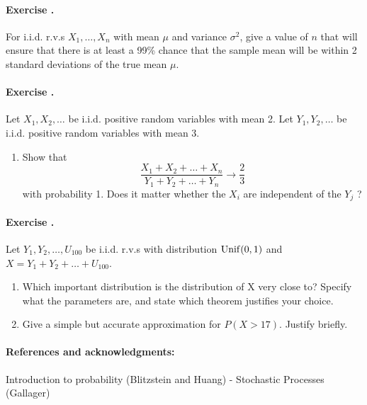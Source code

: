 \documentclass[12pt,a4paper]{article}
\newcounter{num}  %
\begin{document}
	\paragraph{Exercise \thenum.}
	For i.i.d. r.v.s $X_1,\ldots , X_n$ with mean $\mu$ and variance $\sigma^2$, give a value of $n$ that will ensure that there is at least a 99\% chance that the sample mean will
	be within 2 standard deviations of the true mean $\mu$.
	
	
	\paragraph{Exercise \thenum.}
	Let $X_1, X_2,\ldots$ be i.i.d. positive random variables with mean 2. 
	Let $Y_1, Y_2,\ldots$ be i.i.d. positive random variables with mean 3. 
	\begin{enumerate}
		\item Show that
		$$
		\frac{X_1+X_2+\ldots+X_n}{Y_1+Y_2+\ldots+Y_n}\rightarrow \frac{2}{3}
		$$
		with probability 1. 
		Does it matter whether the $X_i$ are independent of the $Y_j$ ?
	\end{enumerate}
	
	\paragraph{Exercise \thenum.}
	Let $Y_1, Y_2,\ldots, U_{100}$ be i.i.d. r.v.s with distribution  ${\rm Unif}(0,1)$ and $X = Y_1 + Y_2 + \ldots + U_{100}$.
	\begin{enumerate}
		\item Which important distribution is the distribution of X very close to? Specify what
		the parameters are, and state which theorem justifies your choice.
		\item Give a simple but accurate approximation for $P(X > 17)$. Justify briefly.
	\end{enumerate}
	
	
	

	
	\paragraph{References and acknowledgments:} Introduction to probability (Blitzstein and Huang) - Stochastic Processes (Gallager)
\end{document}

